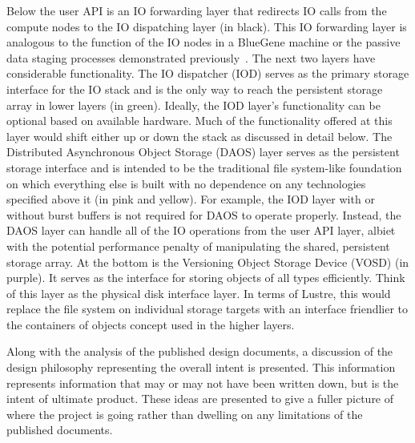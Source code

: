 \documentclass[conference]{IEEEtran}
\begin{document}
Below the user API is an IO forwarding layer that redirects IO calls from the
compute nodes to the IO dispatching layer (in black).  This IO forwarding layer
is analogous to the function of the IO nodes in a BlueGene machine or the
passive data staging processes demonstrated
previously~\cite{nisar:2008:staging,Abbasi:2009:datatap}. The next two layers
have considerable functionality. The IO dispatcher (IOD) serves as the primary
storage interface for the IO stack and is the only way to reach the persistent
storage array in lower layers (in green). Ideally, the IOD layer's
functionality can be optional based on available hardware. Much of the
functionality offered at this layer would shift either up or down the stack as
discussed in detail below. The Distributed Asynchronous Object Storage (DAOS)
layer serves as the persistent storage interface and is intended to be the
traditional file system-like foundation on which everything else is built with
no dependence on any technologies specified above it (in pink and yellow). For
example, the IOD layer with or without burst buffers is not required for DAOS
to operate properly.  Instead, the DAOS layer can handle all of the IO
operations from the user API layer, albiet with the potential performance
penalty of manipulating the shared, persistent storage array. At the bottom is
the Versioning Object Storage Device (VOSD) (in purple).  It serves as the
interface for storing objects of all types efficiently. Think of this layer as
the physical disk interface layer. In terms of Lustre, this would replace the
file system on individual storage targets with an interface friendlier to the
containers of objects concept used in the higher layers.

Along with the analysis of the published design documents, a discussion of the
design philosophy representing the overall intent is presented. This
information represents information that may or may not have been written down,
but is the intent of ultimate product.  These ideas are presented to give a
fuller picture of where the project is going rather than dwelling on any
limitations of the published documents.
\end{document}
